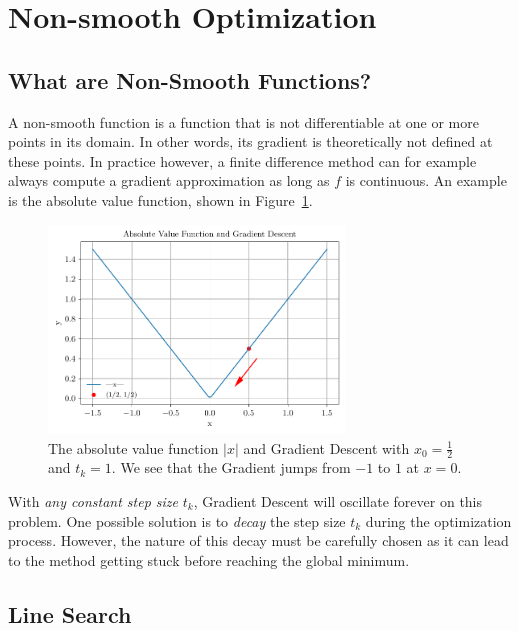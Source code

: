 \documentclass{article}
\begin{document}
\section{Non-smooth Optimization}

\subsection{What are Non-Smooth Functions?}

A non-smooth function is a function that is not differentiable
at one or more points in its domain.
In other words, its gradient is theoretically not defined at these points.
In practice however, a finite difference method can for example always compute
a gradient approximation as long as $f$ is continuous.
An example is the absolute value function, shown in
Figure~\ref{fig:abs_value_function}.

\begin{figure}[htbp]
    \centering
    \includegraphics[width=0.7\textwidth]{plots/abs_val_func.pdf}
    \caption{The absolute value function $|x|$ and Gradient Descent with
        $x_0 = \frac{1}{2}$ and $t_k = 1$.
        We see that the Gradient jumps from $-1$ to $1$ at $x = 0$.
    }
    \label{fig:abs_value_function}
\end{figure}

With \emph{any constant step size} $t_k$,
Gradient Descent will oscillate forever on this problem.
One possible solution is to \emph{decay} the step size
$t_k$ during the optimization process.
However, the nature of this decay must be carefully chosen
as it can lead to the method getting stuck before
reaching the global minimum.

\subsection{Line Search}
\end{document}
